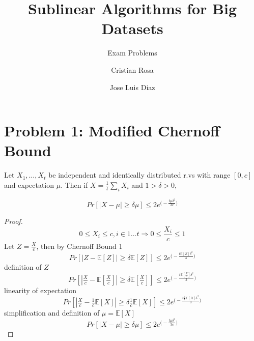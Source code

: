 \documentclass{scrartcl}
\title{Sublinear Algorithms for Big Datasets}
\subtitle{Exam Problems}
\author{Cristian Rosa \and Jose Luis Diaz}
\def\E{\mathds{E}}
\begin{document}
\maketitle

\section*{Problem 1: Modified Chernoff Bound}
Let $X_1, \dots, X_t$ be independent and identically distributed r.vs with range $[0,c]$
and expectation $\mu$. Then if $X = \frac{1}{t} \sum_i X_i$ and $1 > \delta > 0,$    

$$
Pr[|X - \mu| \geq \delta\mu ] \leq 2 e^{\big(- \tfrac{t\mu\delta^2}{3c}\big)}
$$

\begin{proof}
$$
0 \leq X_i \leq c, i \in 1\dots t \Rightarrow 0 \leq \frac{X_i}{c} \leq 1 
$$
Let $Z = \frac{X}{c}$, then by Chernoff Bound 1
$$
Pr[|Z - \E[Z] | \geq \delta \E[Z] ] \leq 2 e^{\big(- \tfrac{t\E[Z]\delta^2}{3}\big)} 
$$
definition of $Z$
$$
Pr[|\tfrac{X}{c} - \E[\tfrac{X}{c}] | \geq \delta \E[\tfrac{X}{c}] ] \leq 2 e^{\big(- \tfrac{t\E[\frac{X}{c}]\delta^2}{3}\big)}
$$
linearity of expectation
$$
Pr[|\tfrac{X}{c} - \tfrac{1}{c}\E[X] | \geq \delta \tfrac{1}{c}\E[X]] \leq 2 e^{\big(- \tfrac{t\frac{1}{c}\E[X]\delta^2}{3}\big)}
$$
simplification and definition of $\mu = \E[X]$
$$
Pr[|X - \mu | \geq \delta \mu] \leq 2 e^{\big(- \tfrac{t\mu\delta^2}{3c}\big)}
$$
\end{proof}
\end{document}
